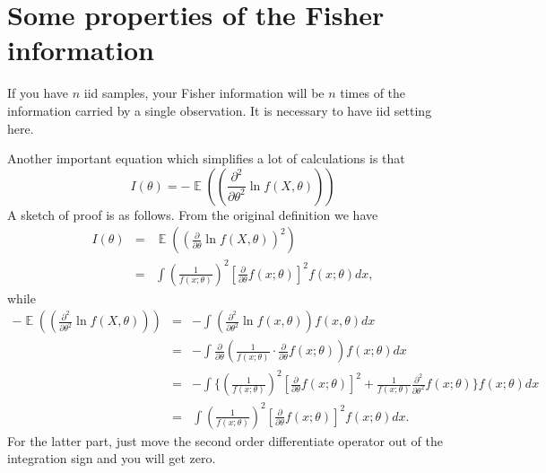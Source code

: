 \documentclass[12pt]{article}
\newcommand{\1}{\mathbbm{1}}
\newcommand{\E}{\operatorname{\mathbb{E}}}
\begin{document}
\section{Some properties of the Fisher information}
If you have $n$ iid samples, your Fisher information will be $n$ times of the information carried by a single observation. It is necessary to have iid setting here. 

Another important equation which simplifies a lot of calculations is that 
$$
I(\theta) =  - \E((\frac{\partial^2}{\partial \theta^2} \ln f(X,\theta)))
$$
A sketch of proof is as follows. From the original definition we have 
\begin{eqnarray*}
I(\theta) & = & \E ((\frac{\partial}{\partial \theta} \ln f(X,\theta))^2) \\
& = & \int (\frac{1}{f(x;\theta)})^2[\frac{\partial}{\partial \theta} f(x;\theta)]^2 f(x;\theta) dx ,
\end{eqnarray*}
while 
\begin{eqnarray*}
 - \E((\frac{\partial^2}{\partial \theta^2} \ln f(X,\theta))) & = & -\int  (\frac{\partial^2}{\partial \theta^2} \ln f(x,\theta)) f(x,\theta) dx \\& = &  -\int 
\frac{\partial}{\partial \theta} (\frac{1}{f(x;\theta)} \cdot \frac{\partial}{\partial \theta} f(x;\theta) )  f(x;\theta) dx \\ & = & - \int\{ (\frac{1}{f(x;\theta)})^2[\frac{\partial}{\partial \theta} f(x;\theta)]^2 + \frac{1}{f(x;\theta)} \frac{\partial^2}{\partial \theta^2} f(x;\theta)\} f(x;\theta) dx \\ &= &  \int (\frac{1}{f(x;\theta)})^2[\frac{\partial}{\partial \theta} f(x;\theta)]^2 f(x;\theta) dx .
\end{eqnarray*}
For the latter part, just move the second order differentiate operator out of the integration sign and you will get zero.
\end{document}
